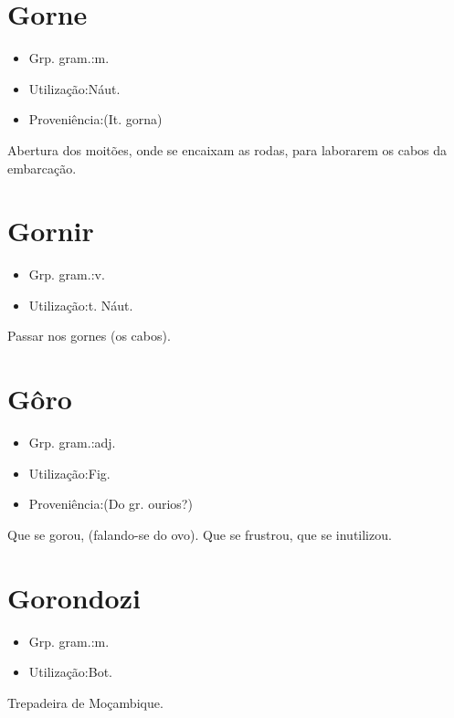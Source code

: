 \section{Gorne}
\begin{itemize}
\item {Grp. gram.:m.}
\end{itemize}
\begin{itemize}
\item {Utilização:Náut.}
\end{itemize}
\begin{itemize}
\item {Proveniência:(It. \textunderscore gorna\textunderscore )}
\end{itemize}
Abertura dos moitões, onde se encaixam as rodas, para laborarem os cabos da embarcação.
\section{Gornir}
\begin{itemize}
\item {Grp. gram.:v.}
\end{itemize}
\begin{itemize}
\item {Utilização:t. Náut.}
\end{itemize}
Passar nos gornes (os cabos).
\section{Gôro}
\begin{itemize}
\item {Grp. gram.:adj.}
\end{itemize}
\begin{itemize}
\item {Utilização:Fig.}
\end{itemize}
\begin{itemize}
\item {Proveniência:(Do gr. \textunderscore ourios\textunderscore ?)}
\end{itemize}
Que se gorou, (falando-se do ovo).
Que se frustrou, que se inutilizou.
\section{Gorondozi}
\begin{itemize}
\item {Grp. gram.:m.}
\end{itemize}
\begin{itemize}
\item {Utilização:Bot.}
\end{itemize}
Trepadeira de Moçambique.
